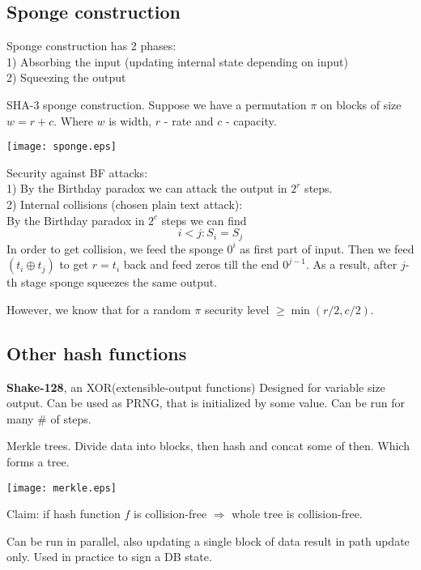 \subsection{Sponge construction}
Sponge construction has 2 phases:\\
1) Absorbing the input (updating internal state depending on input)\\
2) Squeezing the output

\begin{example}
	SHA-3 sponge construction. Suppose we have a permutation $\pi$ on blocks of size $w = r + c$.
	Where $w$ is width, $r$ - rate and $c$ - capacity.

	\texttt{[image: sponge.eps]}

	Security against BF attacks:\\
	1) By the Birthday paradox we can attack the output in $2^r$ steps.\\
	2) Internal collisions (chosen plain text attack):\\
	By the Birthday paradox in $2^c$ steps we can find
	\[ i < j: S_i = S_j \]
	In order to get collision, we feed the sponge $0^i$ as first part of input.
	Then we feed $(t_i \oplus t_j)$ to get $r = t_i$ back and feed zeros till the end $0^{j - 1}$.
	As a result, after $j$-th stage sponge squeezes the same output.

	However, we know that for a random $\pi$ security level $\geq \min(r/2, c/2)$.
\end{example}

\subsection{Other hash functions}

\textbf{Shake-128}, an XOR(extensible-output functions)
Designed for variable size output. Can be used as PRNG, that is initialized by some value.
Can be run for many \# of steps.

\begin{definition}
	Merkle trees. Divide data into blocks, then hash and concat some of then.
	Which forms a tree.

	\texttt{[image: merkle.eps]}

	Claim: if hash function $f$ is collision-free $\Rightarrow$ whole tree is collision-free.

	Can be run in parallel, also updating a single block of data result in path update only.
	Used in practice to sign a DB state.
\end{definition}

